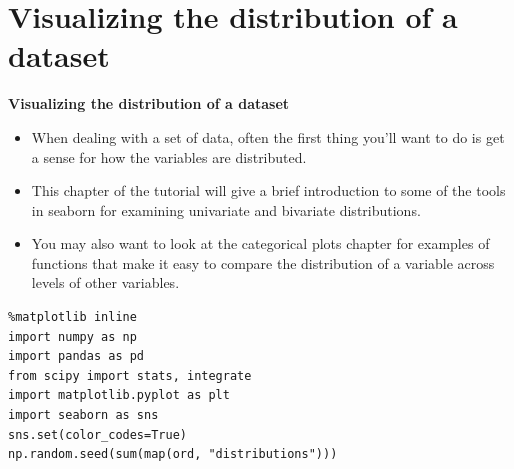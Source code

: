 \documentclass{beamer}
\begin{document}
\section{Visualizing the distribution of a dataset}
\begin{frame}
	\large
	\noindent \textbf{Visualizing the distribution of a dataset}
	\begin{itemize}
\item When dealing with a set of data, often the first thing you’ll want to do is get a sense for how the variables are distributed.
\item  This chapter of the tutorial will give a brief introduction to some of the tools in seaborn for examining univariate and bivariate distributions. 
\item You may also want to look at the categorical plots chapter for examples of functions that make it easy to compare the distribution of a variable across levels of other variables.
	\end{itemize}

\end{frame}
\begin{frame}[fragile]
\begin{framed}
\begin{verbatim}
%matplotlib inline
import numpy as np
import pandas as pd
from scipy import stats, integrate
import matplotlib.pyplot as plt
import seaborn as sns
sns.set(color_codes=True)
np.random.seed(sum(map(ord, "distributions")))
\end{verbatim}
\end{framed}
\end{frame}
\end{document}
